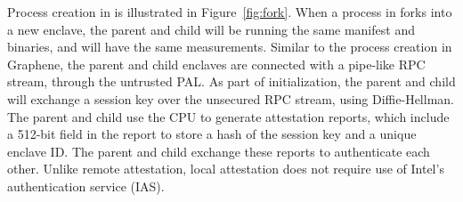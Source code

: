 \begin{comment}
To secure process creation across enclaves,
\graphenesgx{} is capable of building up the trust to newly launched enclaves,
through cooperation with an untrusted host.
Once a clean and trusted new enclave is launched,
The parent process will send a snapshot to the new one,
to create a clone of itself.
Snapshotting and migrating process states
is a feature robustly implemented and heavily used in \graphene{} \libos{},
of which we simply inherit the design.
\end{comment}

Process creation in \graphenesgx{} is illustrated in Figure~\ref{fig:fork}.
When a process in \graphenesgx{} forks into a new enclave,
the parent and child will be running the same manifest and binaries,
and will have the same measurements.
Similar to the process creation in Graphene, the parent and child enclaves are connected with a pipe-like RPC stream, through the untrusted PAL.
As part of initialization, the parent and child will exchange a session key over the unsecured RPC stream, using Diffie-Hellman.
The parent and child use the CPU to generate attestation reports, 
which include a 
512-bit field in the report to store 
a hash of the session key
and a unique enclave ID.
The parent and child exchange these reports to authenticate each other.
Unlike remote attestation, local attestation does not require 
use of Intel's authentication service (IAS).
